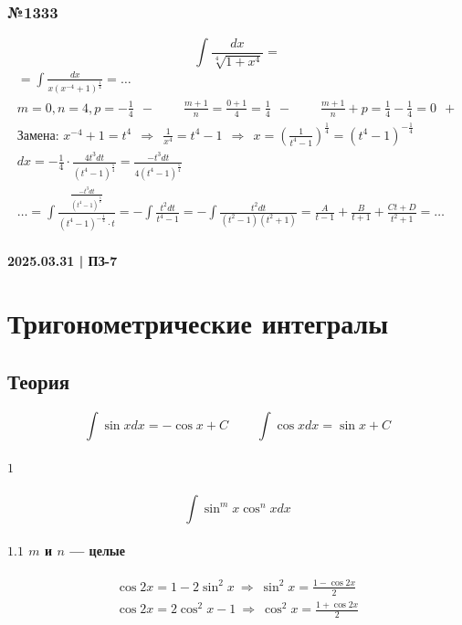 \documentclass{article}
\begin{document}
\subsubsection{№1333}
\[
    \int \frac{dx}{\sqrt[4]{1 + x^4}} =
\]
\begin{gather*}
    = \int \frac{dx}{x\left(x^{-4} + 1\right)^{\frac{1}{4}}} = \dots \\
    m = 0, n = 4, p = -\frac{1}{4} ~~\boxed{-} ~~~~~~~~~~
    \frac{m + 1}{n} = \frac{0 + 1}{4} = \frac{1}{4} ~~\boxed{-} ~~~~~~~~~~
    \frac{m + 1}{n} + p = \frac{1}{4} - \frac{1}{4} = 0 ~~\boxed{+} \\
    \text{Замена: } x^{-4} + 1 = t^4 ~~\Rightarrow~~ 
    \frac{1}{x^4} = t^4 - 1 ~~\Rightarrow~~ 
    x = \left(\frac{1}{t^4 - 1}\right)^{\frac{1}{4}} = \left(t^4 - 1\right)^{-\frac{1}{4}} \\
    dx = -\frac{1}{4} \cdot \frac{4t^3dt}{(t^4 - 1)^{\frac{5}{4}}} = \frac{-t^3dt}{4(t^4 - 1)^{\frac{5}{4}}} \\
    \dots = \int \frac{\frac{-t^3dt}{\left(t^4 - 1\right)^{\frac{5}{4}}}}{\left(t^4 - 1\right)^{-\frac{1}{4}} \cdot t} =
    -\int \frac{t^2dt}{t^4 - 1} =
    -\int \frac{t^2dt}{(t^2 - 1)(t^2 + 1)} =
    \frac{A}{t - 1} + \frac{B}{t + 1} + \frac{Ct + D}{t^2 + 1} = \dots
\end{gather*}




\newpage
\paragraph{2025.03.31 | ПЗ-7}
\section{Тригонометрические интегралы}

\subsection{Теория}
\[
    \int \sin x dx = -\cos x + C ~~~~~~~~~~ \int \cos x dx = \sin x + C
\]
\paragraph{$\boxed{1}$}
\[
    \int \sin^m x \cos^n x dx
\]
\paragraph{$\boxed{1.1}$ $m$ и $n$ --- целые}
\begin{gather*}
    \cos 2x = 1 - 2\sin^2 x ~\Rightarrow~ \sin^2 x = \frac{1 - \cos 2x}{2} \\
    \cos 2x = 2\cos^2 x - 1 ~\Rightarrow~ \cos^2 x = \frac{1 + \cos 2x}{2}
\end{gather*}
\end{document}
